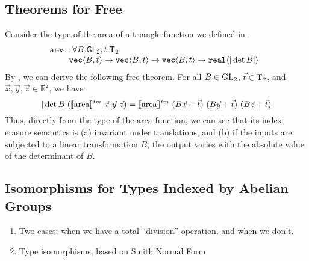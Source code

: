 \subsection{Theorems for Free}
\label{sec:theorems-for-free}

Consider the type of the area of a triangle function we defined in
:
\begin{displaymath}
  \begin{array}{@{}l}
    \mathrm{area} : \forall B\mathord:\SynGL{2}, t\mathord:\SynTransl{2}.\ \\
    \hspace{0.8cm}\tyPrim{vec}{B, t} \to \tyPrim{vec}{B, t} \to \tyPrim{vec}{B, t} \to \tyPrim{real}{|\det B|}
  \end{array}
\end{displaymath}
By , we can derive the following free theorem. For all $B \in \mathrm{GL}_2$, $\vec{t} \in \mathrm{T}_2$, and $\vec{x}, \vec{y}, \vec{z} \in \mathbb{R}^2$, we have 
\begin{displaymath}
  |\det B|(\tmSem{\mathrm{area}}\ \vec{x}\ \vec{y}\ \vec{z}) = \tmSem{\mathrm{area}}\ (B\vec{x} + \vec{t})\ (B\vec{y} + \vec{t})\ (B\vec{z} + \vec{t})
\end{displaymath}
Thus, directly from the type of the $\mathrm{area}$ function, we can
see that its index-erasure semantics is (a) invariant under
translations, and (b) if the inputs are subjected to a linear
transformation $B$, the output varies with the absolute value of the
determinant of $B$.




\subsection{Isomorphisms for Types Indexed by Abelian Groups}
\label{sec:types-indexed-abelian-groups}

\begin{enumerate}
\item Two cases: when we have a total ``division'' operation, and when
  we don't.
\item Type isomorphisms, based on Smith Normal Form
\end{enumerate}

